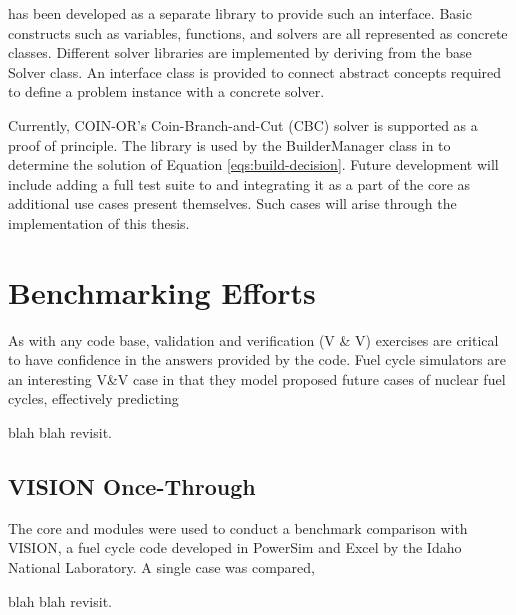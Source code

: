 \Cyclopts has been developed as a separate library to provide such an
interface. Basic constructs such as variables, functions, and solvers are all
represented as concrete classes. Different solver libraries are implemented by
deriving from the base Solver class. An interface class is provided to connect
abstract concepts required to define a problem instance with a concrete solver.

Currently, COIN-OR's Coin-Branch-and-Cut (CBC) \cite{lougee_common_2003} solver
is supported as a proof of principle. The \Cyclopts library is used by the
BuilderManager class in \Cyclus to determine the solution of Equation
\ref{eqs:build-decision}. Future development will include adding a full test
suite to \Cyclopts and integrating it as a part of the \Cyclus core as
additional use cases present themselves. Such cases will arise through the
implementation of this thesis.

\section{Benchmarking Efforts}\label{sec:prev-benchmark}

As with any code base, validation and verification (V \& V) exercises are
critical to have confidence in the answers provided by the code. Fuel cycle
simulators are an interesting V\&V case in that they model proposed future cases
of nuclear fuel cycles, effectively predicting 

blah blah revisit.

\subsection{VISION Once-Through}

The \Cyclus core and \Cycamore modules were used to conduct a benchmark
comparison with VISION, a fuel cycle code developed in PowerSim and Excel by the
Idaho National Laboratory. A single case was compared, 

blah blah revisit.

